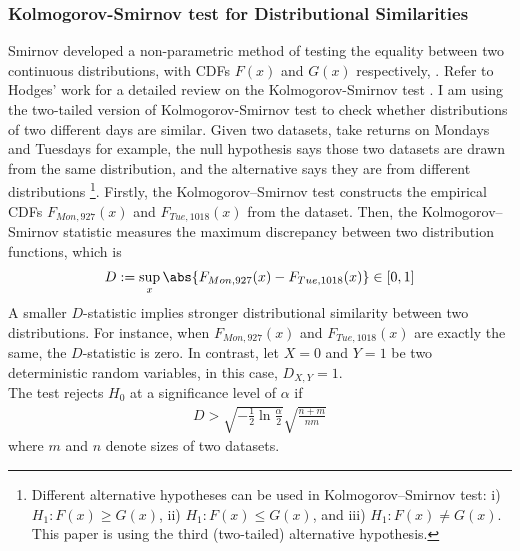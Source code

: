 \documentclass[12pt]{article}
\begin{document}
	\subsubsection{Kolmogorov-Smirnov test for Distributional Similarities}
	\par Smirnov developed a non-parametric method of testing the equality between two continuous distributions, with CDFs $F(x)$ and $G(x)$ respectively, \cite{Smirnov1939}. Refer to Hodges' work for a detailed review on the Kolmogorov-Smirnov test \cite{Hodges1957}. I am using the two-tailed version of Kolmogorov-Smirnov test to check whether distributions of two different days are similar.
	Given two datasets, take returns on Mondays and Tuesdays for example, the null hypothesis says those two datasets are drawn from the same distribution, and the alternative says they are from different distributions \footnote{Different alternative hypotheses can be used in Kolmogorov–Smirnov test: i) $H_1: F(x) \geq G(x)$, ii) $H_1: F(x) \leq G(x)$, and iii) $H_1: F(x) \neq G(x)$. This paper is using the third (two-tailed) alternative hypothesis.}.
	Firstly, the Kolmogorov–Smirnov test constructs the empirical CDFs $F_{Mon, 927}(x)$ and $F_{Tue, 1018}(x)$ from the dataset. Then, the Kolmogorov–Smirnov statistic measures the maximum discrepancy between two distribution functions, which is
	\begin{align}
		D := \sup_x \abs{F_{Mon, 927}(x) - F_{Tue, 1018}(x)} \in [0, 1]
	\end{align}
	A smaller $D$-statistic implies stronger distributional similarity between two distributions. For instance, when $F_{Mon, 927}(x)$ and $F_{Tue, 1018}(x)$ are exactly the same, the $D$-statistic is zero. In contrast, let $X=0$ and $Y=1$ be two deterministic random variables, in this case, $D_{X, Y} = 1$.\\
	The test rejects $H_0$ at a significance level of $\alpha$ if 
	\begin{align}
		D > \sqrt{-\frac{1}{2} \ln \frac{\alpha}{2}} \sqrt{\frac{n+m}{nm}}
	\end{align}
	where $m$ and $n$ denote sizes of two datasets.
\end{document}

